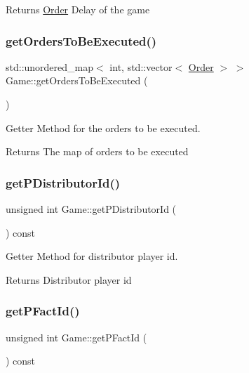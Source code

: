 \begin{DoxyReturn}{Returns}
\hyperlink{classOrder}{Order} Delay of the game 
\end{DoxyReturn}
\mbox{\label{classGame_aaeec900986f34b81e46c369b2ceb0443}} 
\subsubsection{\texorpdfstring{get\+Orders\+To\+Be\+Executed()}{getOrdersToBeExecuted()}}
{\footnotesize\ttfamily std\+::unordered\+\_\+map$<$ int, std\+::vector$<$ \hyperlink{classOrder}{Order} $>$ $>$ Game\+::get\+Orders\+To\+Be\+Executed (\begin{DoxyParamCaption}{ }\end{DoxyParamCaption})}



Getter Method for the orders to be executed. 

\begin{DoxyReturn}{Returns}
The map of orders to be executed 
\end{DoxyReturn}
\mbox{\label{classGame_a55ce7f3ec72183e839c3139db478e367}} 
\subsubsection{\texorpdfstring{get\+P\+Distributor\+Id()}{getPDistributorId()}}
{\footnotesize\ttfamily unsigned int Game\+::get\+P\+Distributor\+Id (\begin{DoxyParamCaption}{ }\end{DoxyParamCaption}) const}



Getter Method for distributor player id. 

\begin{DoxyReturn}{Returns}
Distributor player id 
\end{DoxyReturn}
\mbox{\label{classGame_a9e03bc7bd2beb1b5077db5905dbc8146}} 
\subsubsection{\texorpdfstring{get\+P\+Fact\+Id()}{getPFactId()}}
{\footnotesize\ttfamily unsigned int Game\+::get\+P\+Fact\+Id (\begin{DoxyParamCaption}{ }\end{DoxyParamCaption}) const}



